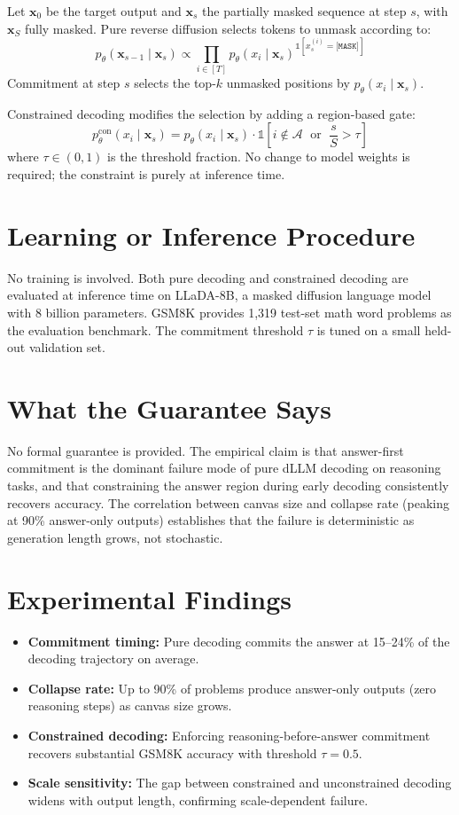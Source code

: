 \documentclass[10pt,twocolumn]{article}
\begin{document}
Let $\mathbf{x}_0$ be the target output and $\mathbf{x}_s$ the partially masked sequence
at step $s$, with $\mathbf{x}_S$ fully masked. Pure reverse diffusion selects tokens
to unmask according to:
\[
p_\theta(\mathbf{x}_{s-1} \mid \mathbf{x}_s) \propto \prod_{i \in [T]} p_\theta(x_i \mid \mathbf{x}_s)^{\mathbb{1}[x_s^{(i)} = \texttt{[MASK]}]}
\]
Commitment at step $s$ selects the top-$k$ unmasked positions by $p_\theta(x_i \mid \mathbf{x}_s)$.

Constrained decoding modifies the selection by adding a region-based gate:
\[
p^{\mathrm{con}}_\theta(x_i \mid \mathbf{x}_s) = p_\theta(x_i \mid \mathbf{x}_s) \cdot \mathbb{1}\!\left[i \notin \mathcal{A} \;\text{ or }\; \frac{s}{S} > \tau\right]
\]
where $\tau \in (0,1)$ is the threshold fraction. No change to model weights is required;
the constraint is purely at inference time.

\section{Learning or Inference Procedure}

No training is involved. Both pure decoding and constrained decoding are evaluated
at inference time on LLaDA-8B, a masked diffusion language model with 8 billion
parameters. GSM8K provides 1,319 test-set math word problems as the evaluation
benchmark. The commitment threshold $\tau$ is tuned on a small held-out validation set.

\section{What the Guarantee Says}

No formal guarantee is provided. The empirical claim is that answer-first commitment
is the dominant failure mode of pure dLLM decoding on reasoning tasks, and that
constraining the answer region during early decoding consistently recovers accuracy.
The correlation between canvas size and collapse rate (peaking at 90\% answer-only
outputs) establishes that the failure is deterministic as generation length grows,
not stochastic.

\section{Experimental Findings}

\begin{itemize}[itemsep=2pt,parsep=0pt]
  \item \textbf{Commitment timing:} Pure decoding commits the answer at 15--24\% of
    the decoding trajectory on average.
  \item \textbf{Collapse rate:} Up to 90\% of problems produce answer-only outputs
    (zero reasoning steps) as canvas size grows.
  \item \textbf{Constrained decoding:} Enforcing reasoning-before-answer commitment
    recovers substantial GSM8K accuracy with threshold $\tau = 0.5$.
  \item \textbf{Scale sensitivity:} The gap between constrained and unconstrained
    decoding widens with output length, confirming scale-dependent failure.
\end{itemize}
\end{document}
